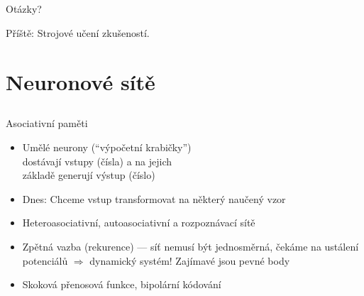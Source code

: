 \documentclass{beamer}
\begin{document}
\subsection{}
\begin{frame}{Otázky?}
\begin{center}
Příště: Strojové učení zkušeností.
\end{center}
\end{frame}

\section{Neuronové sítě}

\subsection{}
\begin{frame}{Asociativní paměti}
\begin{itemize}
\item Umělé neurony (``výpočetní krabičky'') \\ dostávají vstupy (čísla) a na jejich \\ základě generují výstup (číslo)
\item Dnes: Chceme vstup transformovat na některý naučený vzor
\item Heteroasociativní, autoasociativní a rozpoznávací sítě
\item Zpětná vazba (rekurence) --- síť nemusí být jednosměrná,
	čekáme na ustálení potenciálů $\Rightarrow$ dynamický systém!
	Zajímavé jsou pevné body
\item Skoková přenosová funkce, bipolární kódování
\end{itemize}
\end{frame}
\end{document}

